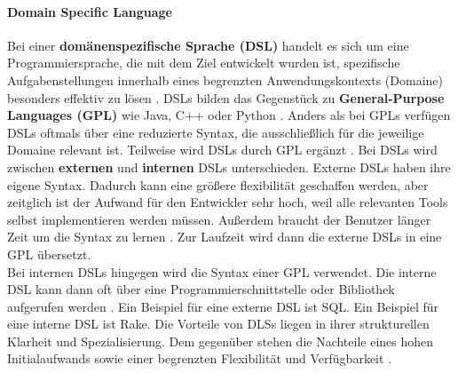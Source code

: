 \documentclass{article}
\begin{document}
    \paragraph{Domain Specific Language}
    Bei einer \textbf{domänenspezifische Sprache (DSL)} handelt es sich um eine Programmiersprache, die mit dem Ziel entwickelt wurden ist, spezifische Aufgabenstellungen innerhalb eines begrenzten Anwendungskontexts (Domaine) besonders effektiv zu lösen \cite{18}.
    DSLs bilden das Gegenstück zu \textbf{General-Purpose Languages (GPL)} wie Java, C++ oder Python \cite{14}.
    Anders als bei GPLs verfügen DSLs oftmals über eine reduzierte Syntax, die ausschließlich für die jeweilige Domaine relevant ist. Teilweise wird DSLs durch GPL ergänzt \cite{18}.
    Bei DSLs wird zwischen \textbf{externen} und \textbf{internen} DSLs unterschieden. Externe DSLs haben ihre eigene Syntax. 
    Dadurch kann eine größere flexibilität geschaffen werden, aber zeitglich ist der Aufwand für den Entwickler sehr hoch, weil alle relevanten Tools selbst implementieren werden müssen. 
    Außerdem braucht der Benutzer länger Zeit um die Syntax zu lernen \cite{7}.
    Zur Laufzeit wird dann die externe DSLs in eine GPL übersetzt.\\
    Bei internen DSLs hingegen wird die Syntax einer GPL verwendet. 
    Die interne DSL kann dann oft über eine Programmierschnittstelle oder Bibliothek aufgerufen werden \cite{14}.
    Ein Beispiel für eine externe DSL ist SQL.
    Ein Beispiel für eine interne DSL ist Rake.
    Die Vorteile von DLSs liegen in ihrer strukturellen Klarheit und Spezialisierung. Dem gegenüber stehen die Nachteile eines hohen Initialaufwands sowie einer begrenzten Flexibilität und Verfügbarkeit \cite{18}.
\end{document}
